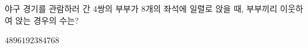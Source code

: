 \hspace*{2mm}\begin{minipage}[t]{\dimexpr\linewidth-2mm\relax}\vspace{0pt}
야구 경기를 관람하러 간 $4$쌍의 부부가 $8$개의 좌석에 일렬로 앉을 때, 부부끼리 이웃하여 앉는 경우의 수는?
\begin{choices32}{$48$}{$96$}{$192$}{$384$}{$768$}\end{choices32}\end{minipage}
